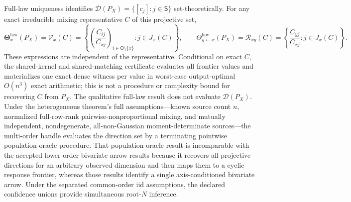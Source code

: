 Full-law uniqueness identifies \(\mathcal D(P_X)=\{[c_j]:j\in\mathsf S\}\) set-theoretically. For any exact irreducible mixing representative \(C\) of this projective set,
\[
 \boldsymbol\Theta_x^{\mathrm{law}}(P_X)
 =\mathcal V_x(C)
 =\left\{\left(\frac{C_{ij}}{C_{xj}}\right)_{i\in\mathsf O\setminus\{x\}}:j\in J_x(C)\right\},
 \qquad
 \Theta_{y\leftarrow x}^{\mathrm{law}}(P_X)
 =\mathcal R_{xy}(C)
 =\left\{\frac{C_{yj}}{C_{xj}}:j\in J_x(C)\right\}.
\]
These expressions are independent of the representative. Conditional on exact \(C\), the shared-kernel and shared-matching certificate evaluates all frontier values and materializes one exact dense witness per value in worst-case output-optimal \(O(n^3)\) exact arithmetic; this is not a procedure or complexity bound for recovering \(C\) from \(P_X\). The qualitative full-law result does not evaluate \(\mathcal D(P_X)\). Under the heterogeneous theorem's full assumptions---known source count \(n\), normalized full-row-rank pairwise-nonproportional mixing, and mutually independent, nondegenerate, all-non-Gaussian moment-determinate sources---the multi-order handle evaluates the direction set by a terminating pointwise population-oracle procedure. That population-oracle result is incomparable with the accepted lower-order bivariate arrow results because it recovers all projective directions for an arbitrary observed dimension and then maps them to a cyclic response frontier, whereas those results identify a single axis-conditioned bivariate arrow. Under the separated common-order iid assumptions, the declared confidence unions provide simultaneous root-\(N\) inference.